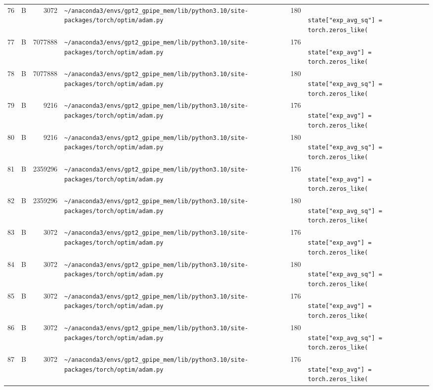 \documentclass{article}
\begin{document}
\begin{longtable}{r l r p{6.5cm} r p{7.0cm}}
76 & B & 3072 & \lstinline|~/anaconda3/envs/gpt2_gpipe_mem/lib/python3.10/site-packages/torch/optim/adam.py| & 180 & \lstinline|                    state["exp_avg_sq"] = torch.zeros_like(| \\
77 & B & 7077888 & \lstinline|~/anaconda3/envs/gpt2_gpipe_mem/lib/python3.10/site-packages/torch/optim/adam.py| & 176 & \lstinline|                    state["exp_avg"] = torch.zeros_like(| \\
78 & B & 7077888 & \lstinline|~/anaconda3/envs/gpt2_gpipe_mem/lib/python3.10/site-packages/torch/optim/adam.py| & 180 & \lstinline|                    state["exp_avg_sq"] = torch.zeros_like(| \\
79 & B & 9216 & \lstinline|~/anaconda3/envs/gpt2_gpipe_mem/lib/python3.10/site-packages/torch/optim/adam.py| & 176 & \lstinline|                    state["exp_avg"] = torch.zeros_like(| \\
80 & B & 9216 & \lstinline|~/anaconda3/envs/gpt2_gpipe_mem/lib/python3.10/site-packages/torch/optim/adam.py| & 180 & \lstinline|                    state["exp_avg_sq"] = torch.zeros_like(| \\
81 & B & 2359296 & \lstinline|~/anaconda3/envs/gpt2_gpipe_mem/lib/python3.10/site-packages/torch/optim/adam.py| & 176 & \lstinline|                    state["exp_avg"] = torch.zeros_like(| \\
82 & B & 2359296 & \lstinline|~/anaconda3/envs/gpt2_gpipe_mem/lib/python3.10/site-packages/torch/optim/adam.py| & 180 & \lstinline|                    state["exp_avg_sq"] = torch.zeros_like(| \\
83 & B & 3072 & \lstinline|~/anaconda3/envs/gpt2_gpipe_mem/lib/python3.10/site-packages/torch/optim/adam.py| & 176 & \lstinline|                    state["exp_avg"] = torch.zeros_like(| \\
84 & B & 3072 & \lstinline|~/anaconda3/envs/gpt2_gpipe_mem/lib/python3.10/site-packages/torch/optim/adam.py| & 180 & \lstinline|                    state["exp_avg_sq"] = torch.zeros_like(| \\
85 & B & 3072 & \lstinline|~/anaconda3/envs/gpt2_gpipe_mem/lib/python3.10/site-packages/torch/optim/adam.py| & 176 & \lstinline|                    state["exp_avg"] = torch.zeros_like(| \\
86 & B & 3072 & \lstinline|~/anaconda3/envs/gpt2_gpipe_mem/lib/python3.10/site-packages/torch/optim/adam.py| & 180 & \lstinline|                    state["exp_avg_sq"] = torch.zeros_like(| \\
87 & B & 3072 & \lstinline|~/anaconda3/envs/gpt2_gpipe_mem/lib/python3.10/site-packages/torch/optim/adam.py| & 176 & \lstinline|                    state["exp_avg"] = torch.zeros_like(| \\

\end{longtable}
\end{document}
